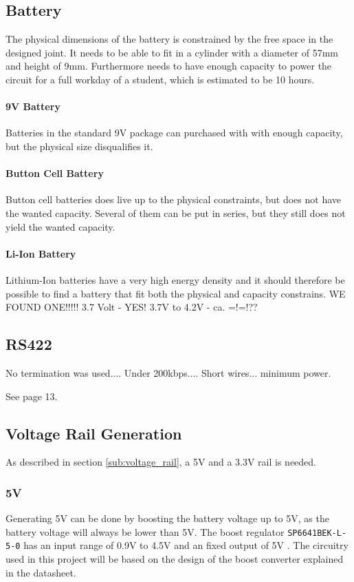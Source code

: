 \subsection{Battery}
\label{subsub:battery}
The physical dimensions of the battery is constrained by the free space in the designed joint.
It needs to be able to fit in a cylinder with a diameter of 57mm and height of 9mm.
Furthermore needs to have enough capacity to power the circuit for a full workday of a student, which is estimated to be 10 hours.

\paragraph{9V Battery}
Batteries in the standard 9V package can purchased with with enough capacity, but the physical size disqualifies it.

\paragraph{Button Cell Battery}
Button cell batteries does live up to the physical constraints, but does not have the wanted capacity. 
Several of them can be put in series, but they still does not yield the wanted capacity.

\paragraph{Li-Ion Battery}
Lithium-Ion batteries have a very high energy density and it should therefore be possible to find a battery that fit both the physical and capacity constrains.
WE FOUND ONE!!!!!
3.7 Volt - YES!
3.7V to 4.2V - ca. =!=!??

\subsection{RS422}
No termination was used....
Under 200kbps....
Short wires...
minimum power.

See \cite{rs422_texas} page 13.

\subsection{Voltage Rail Generation}
\label{sub:voltage_rail_generation}
As described in section \ref{sub:voltage_rail}, a 5V and a 3.3V rail is needed. 

\subsubsection*{5V}
Generating 5V can be done by boosting the battery voltage up to 5V, as the battery voltage will always be lower than 5V.
The boost regulator \texttt{SP6641BEK-L-5-0} has an input range of 0.9V to 4.5V and an fixed output of 5V \cite{sp6641b}.
The circuitry used in this project will be based on the design of the boost converter explained in the datasheet.

